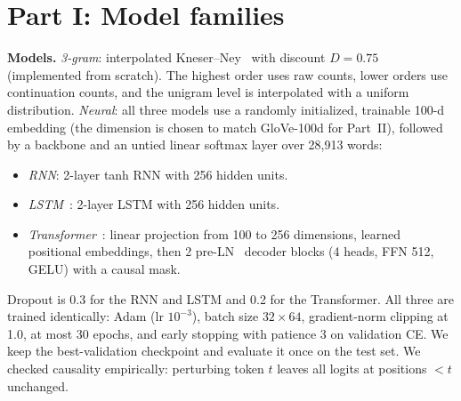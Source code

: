 \documentclass[10pt,a4paper]{article}
\begin{document}
\section{Part I: Model families}
\textbf{Models.} \emph{3-gram}: interpolated Kneser--Ney~\cite{kneser1995,chen1999} with discount $D=0.75$ (implemented from scratch). The highest order uses raw counts, lower orders use continuation counts, and the unigram level is interpolated with a uniform distribution. \emph{Neural}: all three models use a randomly initialized, trainable 100-d embedding (the dimension is chosen to match GloVe-100d for Part~II), followed by a backbone and an untied linear softmax layer over 28,913 words:
\begin{itemize}
  \item \emph{RNN}: 2-layer tanh RNN with 256 hidden units.
  \item \emph{LSTM}~\cite{hochreiter1997}: 2-layer LSTM with 256 hidden units.
  \item \emph{Transformer}~\cite{vaswani2017}: linear projection from 100 to 256 dimensions, learned positional embeddings, then 2 pre-LN~\cite{xiong2020} decoder blocks (4 heads, FFN 512, GELU) with a causal mask.
\end{itemize}
Dropout is 0.3 for the RNN and LSTM and 0.2 for the Transformer. All three are trained identically: Adam (lr $10^{-3}$), batch size $32\times64$, gradient-norm clipping at 1.0, at most 30 epochs, and early stopping with patience 3 on validation CE. We keep the best-validation checkpoint and evaluate it once on the test set. We checked causality empirically: perturbing token $t$ leaves all logits at positions $<t$ unchanged.

\begin{table}[h]
\centering\small
\caption{Prediction quality and cost on the common setup. ``Backbone'' counts parameters excluding the shared-shape 100-d input embedding (2.89M) and the softmax layer (7.43M). The n-gram's inference figure is per-target scoring in Python on the CPU, so it is not directly comparable to the GPU forward passes.}
\label{tab:part1}
\end{table}
\end{document}
